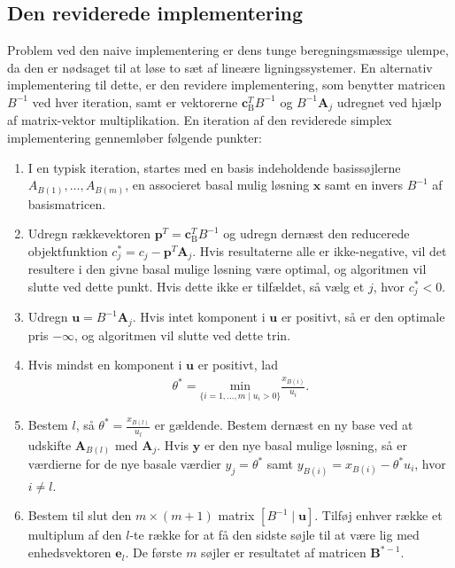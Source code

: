 \subsection{Den reviderede implementering}
Problem ved den naive implementering er dens tunge beregningsmæssige ulempe, da den er nødsaget til at løse to sæt af lineære ligningssystemer. En alternativ implementering til dette, er den revidere implementering, som benytter matricen $B^{-1}$ ved hver iteration, samt er  vektorerne $\mathbf{c}_{\text{B}}^T B^{-1}$ og $B^{-1} \mathbf{A}_j$ udregnet ved hjælp af matrix-vektor multiplikation. En iteration af den reviderede simplex implementering gennemløber følgende punkter: 
% 
\begin{col}{}{}
\begin{enumerate}
\item I en typisk iteration, startes med en basis indeholdende basissøjlerne $A_{B(1)},\ldots,A_{B(m)}$, en associeret basal mulig løsning $\mathbf{x}$ samt en invers $B^{-1}$ af basismatricen. 
\item Udregn rækkevektoren $\mathbf{p}^T=\mathbf{c}_{\text{B}}^T B^{-1}$ og udregn dernæst den reducerede objektfunktion $c_j^* = c_j - \mathbf{p}^T \mathbf{A}_j$. Hvis resultaterne alle er ikke-negative, vil det resultere i den givne basal mulige løsning være optimal, og algoritmen vil slutte ved dette punkt. Hvis dette ikke er tilfældet, så vælg et $j$, hvor $c_j^* < 0$.
\item Udregn $\mathbf{u}=B^{-1}\mathbf{A}_j$. Hvis intet komponent i $\mathbf{u}$ er positivt, så er den optimale pris $-\infty$, og algoritmen vil slutte ved dette trin. 
%
%
\item Hvis mindst en komponent i $\mathbf{u}$ er positivt, lad 
\begin{align*}
\theta^*=\underset{\{i=1,\ldots,m \mid u_i>0\}}{\text{min}}\frac{x_{B(i)}}{u_i}.
\end{align*}
\item Bestem $l$, så $\theta^*=\frac{x_{B(l)}}{u_l}$ er gældende. Bestem dernæst en ny base ved at udskifte $\mathbf{A}_{B(l)}$ med $\mathbf{A}_j$. Hvis $\mathbf{y}$ er den nye basal mulige løsning, så er værdierne for de nye basale værdier $y_j=\theta^*$ samt $y_{B(i)}=x_{B(i)}-\theta^*u_i$, hvor $i \neq l$.
\item Bestem til slut den $m \times (m+1)$ matrix $\left [B^{-1} \mid \mathbf{u} \right ]$. Tilføj enhver række et multiplum af den $l$-te række for at få den sidste søjle til at være lig med enhedsvektoren $\mathbf{e}_l$. De første $m$ søjler er resultatet af matricen $\mathbf{B}^{*-1}$.
\end{enumerate}
\end{col}
\noindent
%
%
